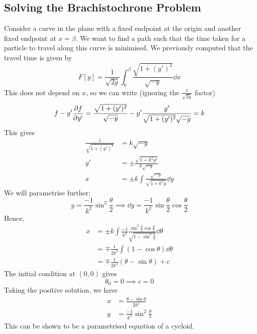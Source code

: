 \subsection{Solving the Brachistochrone Problem}
Consider a curve in the plane with a fixed endpoint at the origin and another fixed endpoint at \(x = \beta\).
We want to find a path such that the time taken for a particle to travel along this curve is minimised.
We previously computed that the travel time is given by
\[
	F[y] = \frac{1}{\sqrt{2g}} \int_0^\beta \frac{\sqrt{1 + (y')^2}}{\sqrt{-y}} \dd{x}
\]
This does not depend on \(x\), so we can write (ignoring the \( \frac{1}{\sqrt{2g}} \) factor)
\[
	f - y' \pdv{f}{y'} = \frac{\sqrt{1 + (y')^2}}{\sqrt{-y}} - y' \frac{y'}{\sqrt{1 + (y')^2} \sqrt{-y}} = k
\]
This gives
\begin{align*}
	\frac{1}{\sqrt{1 + (y')^2}} & = k \sqrt{-y}                                          \\
	y'                          & = \pm \frac{\sqrt{1 + k^2 y^2}}{k\sqrt{-y}}            \\
	x                           & = \pm k \int \frac{\sqrt{-y}}{\sqrt{1 + k^2 y}} \dd{y}
\end{align*}
We will parametrise further:
\[
	y = \frac{-1}{k^2} \sin^2 \frac{\theta}{2} \implies \dd{y} = \frac{-1}{k^2}\sin \frac{\theta}{2} \cos\frac{\theta}{2}
\]
Hence,
\begin{align*}
	x & = \pm k \int \frac{-1}{k^2} \frac{\sin^2 \frac{\theta}{2} \cos \frac{\theta}{2}}{\sqrt{1 - \sin^2 \frac{\theta}{2}}} \dd{\theta} \\
	  & = \mp \frac{1}{2k^2} \int (1 - \cos\theta) \dd{\theta}                                                                           \\
	  & = \mp \frac{1}{2k^2}(\theta - \sin\theta) + c
\end{align*}
The initial condition at \((0, 0)\) gives
\[
	\theta_0 = 0 \implies c = 0
\]
Taking the positive solution, we have
\begin{align*}
	x & = \frac{\theta - \sin\theta}{2k^2}       \\
	y & = \frac{-1}{k^2} \sin^2 \frac{\theta}{2}
\end{align*}
This can be shown to be a parametrised equation of a cycloid.

